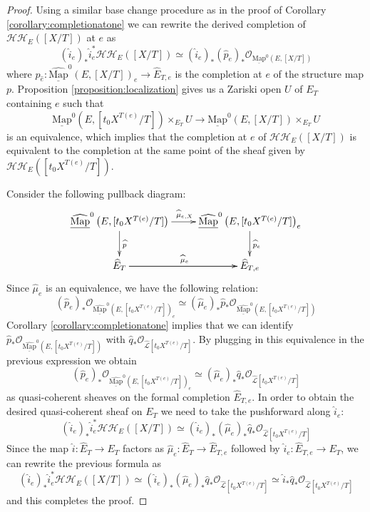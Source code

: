 \documentclass[11pt,letterpaper]{amsart}
\newcommand{\cO}{\mathcal{O}}
\newcommand{\cL}{\mathcal{L}}
\newcommand{\cHH}{\mathcal{HH}}
\newcommand{\Mapo}[2]{\underline{\mathrm{Map}}^{0}\left (#1,#2\right )}
\newcommand{\fMapo}[2]{\underline{\widehat{\mathrm{Map}}}^{0}\left (#1,#2\right )}
\begin{document}
\begin{proof}
Using a similar base change procedure as in the proof of Corollary \ref{corollary:completionatone} we can rewrite the derived completion of $\cHH_E([X/T])$ at $e$ as
\begin{equation*}
(\widehat{i}_e)_\ast\widehat{i}_e^\ast \cHH_E([X/T])\simeq (\widehat{i}_e)_\ast (\widehat{p}_{e})_\ast\cO_{\Mapo{E}{[X/T]}}
\end{equation*}
where $p_{\widehat{e}}:\fMapo{E}{[X/T]}_{e}\rightarrow\widehat{E}_{T,e}$ is the completion at $e$ of the structure map $p$. Proposition \ref{proposition:localization} gives us a Zariski open $U$ of $E_T$ containing $e$ such that $$\Mapo{E}{[t_0 X^{T(e)}/T]}\times_{E_T} U\rightarrow\Mapo{E}{[X/T]}\times_{E_T} U$$ is an equivalence, which implies that the completion at $e$ of $\cHH_E([X/T])$ is equivalent to the completion at the same point of the sheaf given by $\cHH_E([t_0 X^{T(e)}/T])$. 




Consider the following pullback diagram:
$$
\xymatrix{
\fMapo{E}{[t_0 X^{T(e)}/T]} \ar[r]^{\widehat{\mu}_{e,X}}\ar[d]^{\widehat{p}} & \fMapo{E}{[t_0 X^{T(e)}/T]}_{e}\ar[d]^{\widehat{p}_e} \\
\widehat{E}_{T}\ar[r]^{\widehat{\mu}_e} \ar[r] & \widehat{E}_{T,e}
}
$$
Since $\widehat{\mu}_e$ is an equivalence, we have the following relation:
\begin{equation*}
(\widehat{p}_{e})_{\ast}\cO_{\fMapo{E}{[t_0 X^{T(e)}/T]}_{e}} \simeq (\widehat{\mu}_{e})_{\ast}\widehat{p}_{\ast}\cO_{\fMapo{E}{[t_0 X^{T(e)}/T]}}
\end{equation*}
Corollary \ref{corollary:completionatone} implies that we can identify $\widehat{p}_{\ast}\cO_{\fMapo{E}{[t_0 X^{T(e)}/T]}}$ with $\widehat{q}_{\ast}\cO_{\widehat{\cL}[t_0 X^{T(e)}/T]}$. By plugging in this equivalence in the previous expression we obtain
\begin{equation*}
(\widehat{p}_{e})_{\ast}\cO_{\fMapo{E}{[t_0 X^{T(e)}/T]}_{e}} \simeq (\widehat{\mu}_{e})_{\ast}\widehat{q}_{\ast}\cO_{\widehat{\cL}[t_0 X^{T(e)}/T]}
\end{equation*}
as quasi-coherent sheaves on the formal completion $\widehat{E}_{T,e}$. In order to obtain the desired quasi-coherent sheaf on $E_T$ we need to take the pushforward  along $\widehat{i}_e$: 
$$
(\widehat{i}_e)_\ast\widehat{i}_e^\ast \cHH_E([X/T]) \simeq (\widehat{i}_e)_{\ast}(\widehat{\mu}_{e})_{\ast}\widehat{q}_{\ast}\cO_{\widehat{\cL}[t_0 X^{T(e)}/T]}
$$
Since the map $\widehat{i}:\widehat{E}_T\rightarrow E_T$ factors as $\widehat{\mu}_e:\widehat{E}_T\rightarrow\widehat{E}_{T,e}$ followed by $\widehat{i}_e:\widehat{E}_{T,e}\rightarrow E_T$, we can rewrite the previous formula as 
\begin{equation*}
(\widehat{i}_e)_\ast\widehat{i}_e^\ast \cHH_E([X/T]) \simeq 
(\widehat{i}_e)_{\ast}(\widehat{\mu}_{e})_{\ast}\widehat{q}_{\ast}\cO_{\widehat{\cL}[t_0 X^{T(e)}/T]}
\simeq 
\widehat{i}_{\ast}\widehat{q}_{\ast}\cO_{\widehat{\cL}[t_0 X^{T(e)}/T]}
\end{equation*}
and this completes the proof.
\end{proof}
\end{document}
